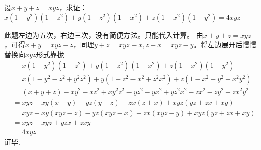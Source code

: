 \documentclass[windows,csize4,answers]{BHCexam}
\begin{document}
\begin{groups}
\begin{questions}[]
        \question[5]  设$x+y+z=xyz$，求证：$x(1-y^2)(1-z^2)+y(1-z^2)(1-x^2)+z(1-x^2)(1-y^2)=4xyz$
        \begin{solution}{0.5cm}
            \methodonly 此题左边为五次，右边三次，没有简便方法。只能代入计算。
            由$x+y+z=xyz$，可得$x+y=xyz-z$，同理$y+z=xyz-x, z+x=xyz-y$。将左边展开后慢慢替换向$xyz$形式靠拢
            \[
                \begin{aligned}
                    &\phantom{=}x(1-y^2)(1-z^2)+y(1-z^2)(1-x^2)+z(1-x^2)(1-y^2) \\
                    &=x(1-y^2-z^2+y^2z^2)+y(1-z^2-x^2+z^2x^2) +z(1-x^2-y^2+x^2y^2) \\
                    &=(x+y+z)-xy^2-xz^2+xy^2z^2-yz^2-yx^2+yz^2x^2-zx^2-zy^2+zx^2y^2 \\ 
                    &=xyz-xy(x+y)-yz(y+z)-zx(z+x)+xyz(yz+zx+xy) \\ 
                    &=xyz-xy(xyz-z)-yz(xyz-x)-zx(xyz-y)+xyz(yz+zx+xy) \\ 
                    &=xyz+xyz+yzx+zxy \\ 
                    &=4xyz
                \end{aligned}
            \]
            证毕.
        \end{solution}


    \end{questions}
\end{groups}



\label{lastpage}
\end{document}
